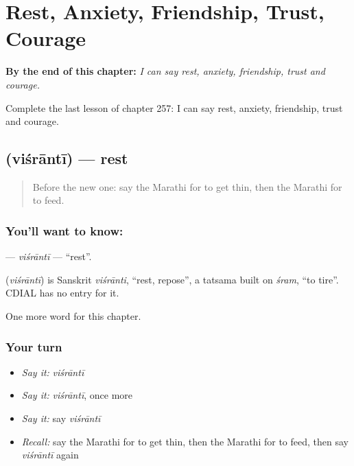 
\chapter{Rest, Anxiety, Friendship, Trust, Courage}
\label{ch:mr-rest-anxiety-friendship-trust-courage}

\begin{chapteropening}
\textbf{By the end of this chapter:} \emph{I can say rest, anxiety, friendship, trust and courage.}

Complete the last lesson of chapter 257: I can say rest, anxiety, friendship, trust and courage.
\end{chapteropening}

\section[\texorpdfstring{\mr{विश्रांती} (viśrāntī)}{विश्रांती (viśrāntī)}]{ (viśrāntī) — rest}

\label{lesson:MR-C257-visranti}



\begin{quote}
Before the new one: say the Marathi for to get thin, then the Marathi for to feed.
\end{quote}

\subsection*{You'll want to know: }
\textbf{} — \emph{viśrāntī} — \textquotedblleft{}rest\textquotedblright{}.

\begin{cousinweb}
\textbf{} (\emph{viśrāntī}) is Sanskrit \emph{viśrānti}, \textquotedblleft{}rest, repose\textquotedblright{}, a tatsama built on \emph{śram}, \textquotedblleft{}to tire\textquotedblright{}. CDIAL has no entry for it.
\end{cousinweb}

\begin{grammarlens}[title={What you've built}]
One more word for this chapter.
\end{grammarlens}

\subsection*{Your turn}
\begin{itemize}
\raggedright
  \item \emph{Say it:} \emph{viśrāntī}
  \item \emph{Say it:} \emph{viśrāntī}, once more
  \item \emph{Say it:} say \emph{viśrāntī}
  \item \emph{Recall:} say the Marathi for to get thin, then the Marathi for to feed, then say \emph{viśrāntī} again
\end{itemize}

